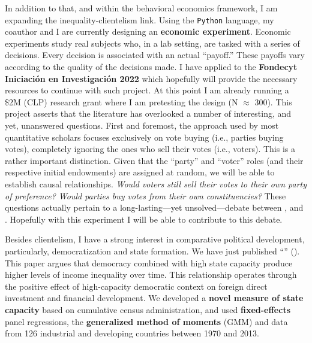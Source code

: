 \documentclass[10pt,stdletter,dateno,sigleft]{newlfm} %
\begin{document}
\begin{newlfm}
In addition to that, and within the behavioral economics framework, I am expanding the inequality-clientelism link. Using the \texttt{Python} language, my coauthor and I are currently designing an {\bf economic experiment}. Economic experiments study real subjects who, in a lab setting, are tasked with a series of decisions. Every decision is associated with an actual ``payoff.'' These payoffs vary according to the quality of the decisions made. I have applied to the {\bf Fondecyt Iniciaci\'on en Investigaci\'on 2022} which hopefully will provide the necessary resources to continue with such project. At this point I am already running a \$2M (CLP) research grant where I am pretesting the design (N $\approx$ 300).  This project asserts that the literature has overlooked a number of interesting, and yet, unanswered questions. First and foremost, the approach used by most quantitative scholars focuses exclusively on vote buying (i.e., parties buying votes), completely ignoring the ones who sell their votes (i.e., voters). This is a rather important distinction. Given that the ``party'' and ``voter'' roles (and their respective initial endowments) are assigned at random, we will be able to establish causal relationships. \emph{Would voters still sell their votes to their own party of preference? Would parties buy votes from their own constituencies?} These questions actually pertain to a long-lasting---yet unsolved---debate between \textcite{Dixit1996}, \textcite{Cox1986} and \textcite{Stokes2005}. Hopefully with this experiment I will be able to contribute to this debate.

Besides clientelism, I have a strong interest in comparative political development, particularly, democratization and state formation. We have just published ``\href{https://github.com/hbahamonde/Inequality_State_Capacity/raw/main/Bahamonde_Trasberg.pdf}{\unskip}'' ({\unskip}). This paper argues that democracy combined with high state capacity produce higher levels of income inequality over time. This relationship operates through the positive effect of high-capacity democratic context on foreign direct investment and financial development. We developed a {\bf novel measure of state capacity} based on cumulative census administration, and used {\bf fixed-effects} panel regressions, the {\bf generalized method of moments} (GMM) and data from 126 industrial and developing countries between 1970 and 2013. 


\end{newlfm}
\end{document}
